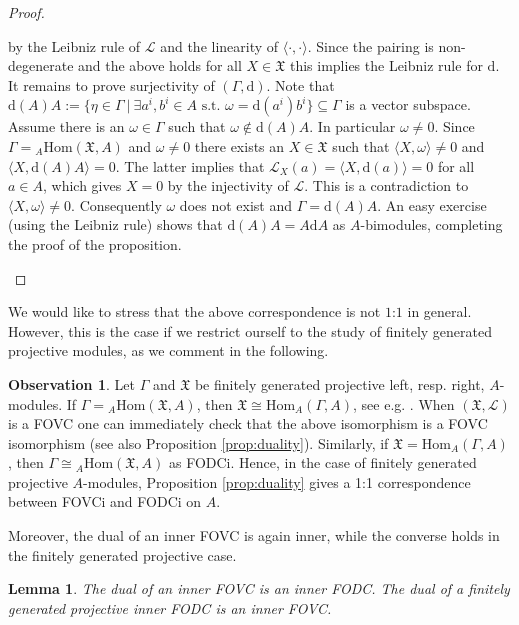 \documentclass{article}
\newtheorem{lemma}[thm]{Lemma}
\theoremstyle{definition}
\newtheorem{observation}[thm]{Observation}
\begin{document}
\begin{proof}
\begin{enumerate}
			by the Leibniz rule of $\mathscr{L}$ and the linearity of $\langle\cdot,\cdot\rangle$. Since the pairing is non-degenerate and the above holds for all $X\in\mathfrak{X}$ this implies the Leibniz rule for $\mathrm{d}$. It remains to prove surjectivity of $(\Gamma,\mathrm{d})$. Note that $\mathrm{d}(A)A:=\{\eta\in\Gamma~|~\exists a^i,b^i\in A \text{ s.t. }\omega=\mathrm{d}(a^i)b^i\}\subseteq\Gamma$ is a vector subspace. Assume there is an $\omega\in\Gamma$ such that $\omega\notin\mathrm{d}(A)A$. In particular $\omega\neq 0$. Since $\Gamma={}_A\mathrm{Hom}(\mathfrak{X},A)$ and $\omega\neq 0$ there exists an $X\in\mathfrak{X}$ such that $\langle X,\omega\rangle\neq 0$ and $\langle X,\mathrm{d}(A)A\rangle=0$. The latter implies that $\mathscr{L}_X(a)=\langle X,\mathrm{d}(a)\rangle=0$ for all $a\in A$, which gives $X=0$ by the injectivity of $\mathscr{L}$. This is a contradiction to $\langle X,\omega\rangle\neq 0$. Consequently $\omega$ does not exist and $\Gamma=\mathrm{d}(A)A$. An easy exercise (using the Leibniz rule) shows that $\mathrm{d}(A)A=A\mathrm{d}A$ as $A$-bimodules, completing the proof of the proposition.
		\end{enumerate}
	\end{proof}
	We would like to stress that the above correspondence is not $1$:$1$ in general. However, this is the case if we restrict ourself to the study of finitely generated projective modules, as we comment in the following.
	\begin{observation}\label{obs:fd}
		Let $\Gamma$ and $\mathfrak{X}$ be finitely generated projective 
		left, resp. right, $A$-modules.
		If $\Gamma={}_A\mathrm{Hom}(\mathfrak{X},A)$, then
		$\mathfrak{X}\cong\mathrm{Hom}_A(\Gamma,A)$, see e.g. \cite[Section 2.2]{paolo}. When $(\mathfrak{X},\mathscr{L})$ is a FOVC
		one can immediately check that the above isomorphism is a FOVC isomorphism (see also Proposition \ref{prop:duality}).
		Similarly, if $\mathfrak{X}=\mathrm{Hom}_A(\Gamma,A)$, then
		$\Gamma \cong {}_A\mathrm{Hom}(\mathfrak{X},A)$ as FODCi. Hence, in the case of 
		finitely generated projective $A$-modules, 
		Proposition \ref{prop:duality} gives a 1:1 correspondence
		between FOVCi and FODCi on $A$. 
	\end{observation}
	Moreover, the dual of an inner FOVC is again inner, while the converse holds in the finitely generated projective case.
	\begin{lemma}\label{lem:inner}
		The dual of an inner FOVC is an inner FODC. The dual of a finitely generated projective inner FODC is an inner FOVC.
	\end{lemma}
\end{document}
